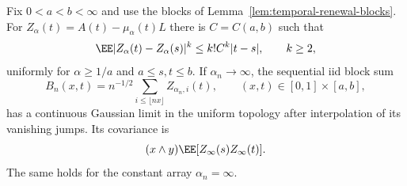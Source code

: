 \documentclass[11pt,letterpaper]{article}
\begin{document}
\begin{lemma}
\label{lem:temporal-block-tightness}
Fix $0<a<b<\infty$ and use the blocks of
Lemma~\ref{lem:temporal-renewal-blocks}. For
$Z_\alpha(t)=A(t)-\mu_\alpha(t)L$ there is $C=C(a,b)$ such that
\begin{equation}\label{eq:temporal-block-increment}
 \EE|Z_\alpha(t)-Z_\alpha(s)|^k
       \le k!C^k|t-s|,\qquad k\ge2,
\end{equation}
uniformly for $\alpha\ge1/a$ and $a\le s,t\le b$.
If $\alpha_n\to\infty$, the sequential iid block sum
\[
 B_n(x,t)=n^{-1/2}\sum_{i\le\lfloor nx\rfloor}Z_{\alpha_n,i}(t),
       \qquad (x,t)\in[0,1]\times[a,b],
\]
has a continuous Gaussian limit in the uniform topology after
interpolation of its vanishing jumps. Its covariance is
\[
 (x\wedge y)\EE[Z_\infty(s)Z_\infty(t)].
\]
The same holds for the constant array $\alpha_n=\infty$.
\end{lemma}
\end{document}
